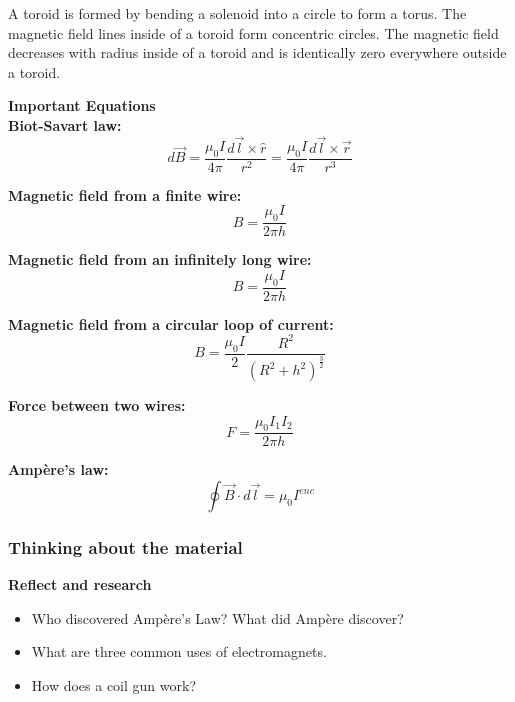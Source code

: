 A toroid is formed by bending a solenoid into a circle to form a torus. The magnetic field lines inside of a toroid form concentric circles. The magnetic field decreases with radius inside of a toroid and is identically zero everywhere outside a toroid.

\begin{framed}
\textbf{Important Equations}\\
\textbf{Biot-Savart law:}
\begin{equation}
d\vec B = \frac{\mu_0 I}{4\pi}\frac{d\vec l\times \hat r}{r^2}=\frac{\mu_0 I}{4\pi}\frac{d\vec l\times \vec r}{r^3}
\end{equation}

\textbf{Magnetic field from a finite wire:}
\begin{equation}
B = \frac{\mu_0 I}{2\pi h}
\end{equation}

\textbf{Magnetic field from an infinitely long wire:}
\begin{equation}
B = \frac{\mu_0 I}{2\pi h}
\end{equation}

\textbf{Magnetic field from a circular loop of current:}
\begin{equation}
B=\frac{\mu_0 I}{2} \frac{R^2}{(R^2+h^2)^\frac{3}{2}}
\end{equation}

\textbf{Force between two wires:}
\begin{equation}
F = \frac{\mu_0I_1I_2}{2\pi h}
\end{equation}

\textbf{Ampère's law:}
\begin{equation}
\oint \vec B \cdot d\vec l =\mu_0 I^{enc}
\end{equation}
\end{framed}

\subsubsection{Thinking about the material}

\begin{framed}
\textbf{Reflect and research}\\
\begin{itemize}
\item Who discovered Ampère's Law? What did Ampère discover?
\item What are three common uses of electromagnets.
\item How does a coil gun work?
\end{itemize}
\end{framed}

